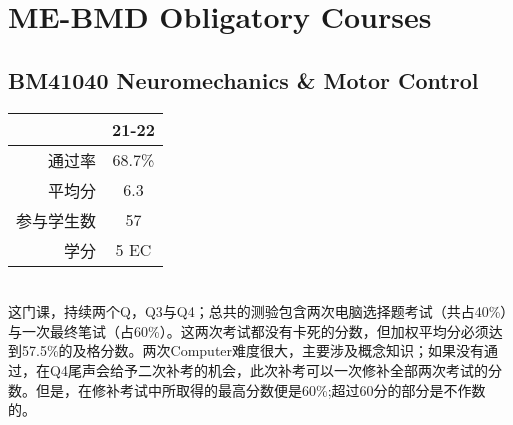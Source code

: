 \vspace{\betsubsec} %
\section{ME-BMD Obligatory Courses}
\subsection{BM41040 Neuromechanics \& Motor Control}\hypertarget{BM41040}{} 
\begin{minipage}{0.45\textwidth}
\centering
{}
\end{minipage}%
\begin{minipage}{0.45\textwidth}
\raggedleft
\begin{tabular}{r|c}
\textbf{ } & \textbf{21-22} \\ \hline
通过率 & 68.7\% \\ 
平均分 &  6.3\\ 
参与学生数 &  57\\
学分 & 5 EC\\
\end{tabular}
\end{minipage}\\

这门课，持续两个Q，Q3与Q4；总共的测验包含两次电脑选择题考试（共占40\%）与一次最终笔试（占60\%）。这两次考试都没有卡死的分数，但加权平均分必须达到57.5\%的及格分数。两次Computer难度很大，主要涉及概念知识；如果没有通过，在Q4尾声会给予二次补考的机会，此次补考可以一次修补全部两次考试的分数。但是，在修补考试中所取得的最高分数便是60\%;超过60分的部分是不作数的。

